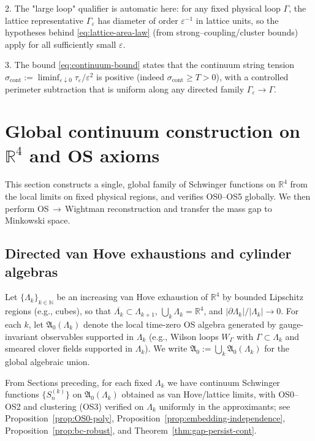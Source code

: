 \documentclass[11pt]{amsart}
\theoremstyle{plain}
\theoremstyle{definition}
\theoremstyle{remark}
\begin{document}
2. The "large loop" qualifier is automatic here: for any fixed physical loop $\Gamma$, the lattice representative $\Gamma_\varepsilon$ has diameter of order $\varepsilon^{-1}$ in lattice units, so the hypotheses behind \eqref{eq:lattice-area-law} (from strong--coupling/cluster bounds) apply for all sufficiently small $\varepsilon$.

3. The bound \eqref{eq:continuum-bound} states that the continuum string tension $\sigma_{\text{cont}}:=\liminf_{\varepsilon\downarrow 0}\tau_\varepsilon/\varepsilon^2$ is positive (indeed $\sigma_{\text{cont}}\ge T>0$), with a controlled perimeter subtraction that is uniform along any directed family $\Gamma_\varepsilon\to\Gamma$.

\section{Global continuum construction on $\mathbb R^4$ and OS axioms}\label{sec:global-R4}

This section constructs a single, global family of Schwinger functions on $\mathbb R^4$ from the local limits on fixed physical regions, and verifies OS0--OS5 globally. We then perform OS\,$\to$\,Wightman reconstruction and transfer the mass gap to Minkowski space.

\subsection{Directed van Hove exhaustions and cylinder algebras}

Let $\{\Lambda_k\}_{k\in\mathbb N}$ be an increasing van Hove exhaustion of $\mathbb R^4$ by bounded Lipschitz regions (e.g., cubes), so that $\overline{\Lambda_k}\subset\Lambda_{k+1}$, $\bigcup_k \Lambda_k=\mathbb R^4$, and $|\partial\Lambda_k|/|\Lambda_k|\to 0$. For each $k$, let $\mathfrak A_0(\Lambda_k)$ denote the local time-zero OS algebra generated by gauge-invariant observables supported in $\Lambda_k$ (e.g., Wilson loops $W_\Gamma$ with $\Gamma\subset\Lambda_k$ and smeared clover fields supported in $\Lambda_k$). We write $\mathfrak A_0:=\bigcup_k \mathfrak A_0(\Lambda_k)$ for the global algebraic union.

From Sections preceding, for each fixed $\Lambda_k$ we have continuum Schwinger functions $\{S^{(k)}_n\}$ on $\mathfrak A_0(\Lambda_k)$ obtained as van Hove/lattice limits, with OS0--OS2 and clustering (OS3) verified on $\Lambda_k$ uniformly in the approximants; see Proposition~\ref{prop:OS0-poly}, Proposition~\ref{prop:embedding-independence}, Proposition~\ref{prop:bc-robust}, and Theorem~\ref{thm:gap-persist-cont}.
\end{document}
